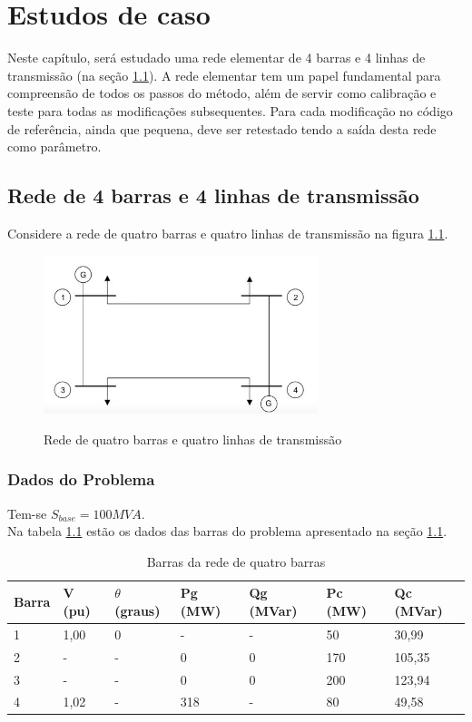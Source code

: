 \chapter{Estudos de caso}
\label{SectionEstudosDeCaso}
Neste capítulo, será estudado uma rede elementar de 4 barras e 4 linhas de transmissão (na seção \ref{SectionRedePequena}). A rede elementar tem um papel fundamental para compreensão de todos os passos do método, além de servir como calibração e teste para todas as modificações subsequentes. Para cada modificação no código de referência, ainda que pequena, deve ser retestado tendo a saída desta rede como parâmetro.
\section{Rede de 4 barras e 4 linhas de transmissão}
\label{SectionRedePequena}
Considere a rede de quatro barras e quatro linhas de transmissão na figura \ref{FigRede4barrasLinearizado}.\\
\begin{figure}[!htb]
\caption{Rede de quatro barras e quatro linhas de transmissão}
 \centering %
\includegraphics[width=8cm]{figuras/Linearizado4barrasValida.JPG}
\label{FigRede4barrasLinearizado}
\end{figure}

\subsection{Dados do Problema}
Tem-se $S_{base}=100MVA$.\\ 
Na tabela \ref{t_redePequenaBarras} estão os dados das barras do problema apresentado na seção \ref{SectionRedePequena}.\\
\begin{table}[!htb]
\centering
\caption{Barras da rede de quatro barras}
\begin{tabular}{lllllll}
\hline
Barra & V (pu) & $\theta$ (graus) & Pg (MW) & Qg (MVar) & Pc (MW) & Qc (MVar)   \\ \hline
1 & 1,00 & 0 & - & - & 50 & 30,99   \\
2 & - & -& 0& 0 & 170 & 105,35    \\
3 & - & - & 0 & 0 & 200 & 123,94   \\
4 & 1,02  & - & 318 & - & 80 & 49,58 \\ \hline
\end{tabular}
\label{t_redePequenaBarras}
\end{table}

